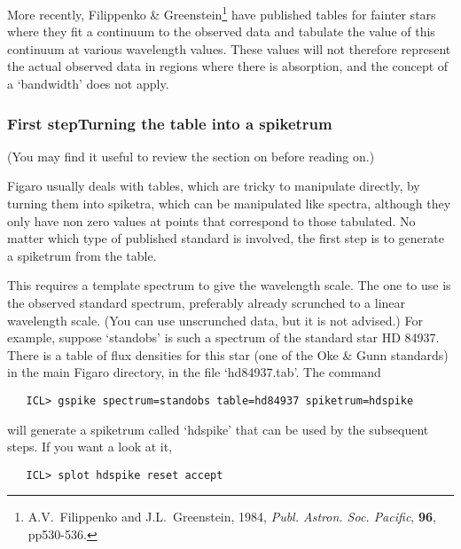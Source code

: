    More recently, Filippenko \& Greenstein\footnote{A.V.~Filippenko and
   J.L.~Greenstein, 1984, {\it Publ. Astron. Soc. Pacific}, {\bf 96},
   pp530-536.} have published tables for fainter stars where they fit a
   continuum to the observed data and tabulate the value of this continuum
   at various wavelength values.  These values will not therefore represent
   the actual observed data in regions where there is absorption, and the
   concept of a `bandwidth' does not apply.


\subsubsection{\label{techno5first}First step\latorhtm{---}{-}Turning the
   table into a spiketrum}

   (You may find it useful to review
   {the section on }
   before reading on.)

   Figaro usually deals with tables, which are tricky to manipulate
   directly, by turning them into spiketra, which can be manipulated
   like spectra, although they only have non zero values at points that
   correspond to those tabulated.  No matter which type of published
   standard is involved, the first step is to generate a spiketrum from
   the table.

   This requires a template spectrum to give the wavelength scale.  The
   one to use is the observed standard spectrum, preferably already
   scrunched to a linear wavelength scale.  (You can use unscrunched
   data, but it is not advised.)  For example, suppose `standobs' is
   such a spectrum of the standard star HD 84937.  There is a table of
   flux densities for this star (one of the Oke \& Gunn standards) in
   the main Figaro directory, in the file `hd84937.tab'.  The command

\begin{verbatim}
   ICL> gspike spectrum=standobs table=hd84937 spiketrum=hdspike
\end{verbatim}

   will generate a spiketrum called `hdspike' that can be used by the
   subsequent steps.  If you want a look at it,

\begin{verbatim}
   ICL> splot hdspike reset accept
\end{verbatim}

